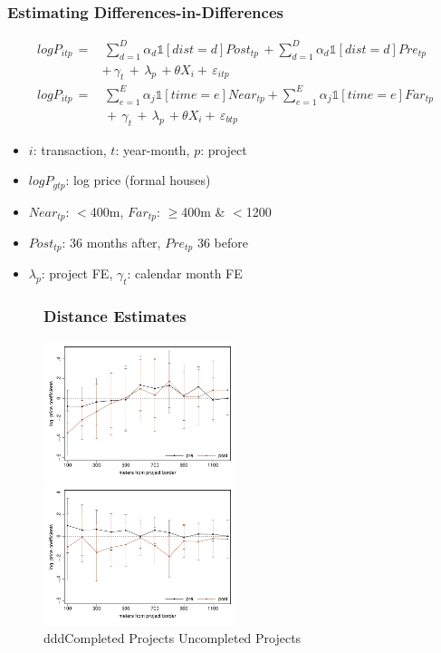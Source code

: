 \documentclass[aspectratio=149]{beamer}
\begin{document}
\begin{frame}
\frametitle{Estimating Differences-in-Differences}

\begin{align*}
log P_{itp} \, =& \, \sum_{d=1}^{D} \alpha_d \mathds{1}[dist=d] Post_{tp} \, + \sum_{d=1}^{D} \alpha_d \mathds{1}[dist=d] Pre_{tp} \\
& + \, \gamma_t \, + \, \lambda_p \, + \theta X_{i} + \, \varepsilon_{itp} \\
log P_{itp} \, =& \, \sum_{e=1}^{E} \alpha_j \mathds{1}[time=e] Near_{tp} + \sum_{e=1}^{E} \alpha_j \mathds{1}[time=e] Far_{tp} \\
& \, + \, \gamma_t \, + \, \lambda_p \, + \theta X_{i} + \, \varepsilon_{btp}
\end{align*}

\begin{itemize}
\item $i$: transaction, $t$: year-month, $p$: project
\item $log P_{gtp}$: log price (formal houses)
\item $Near_{tp}$: $<$400m, $Far_{tp}$: $\geq$400m \& $<$1200
\item $Post_{tp}$: 36 months after, $Pre_{tp}$ 36 before
\item $\lambda_p$: project FE, $\gamma_t$: calendar month FE
\end{itemize}


\end{frame}


\begin{frame}
\begin{figure}
\frametitle{Distance Estimates}
\includegraphics[width=0.5\textwidth,trim={.77cm 0cm .21cm 0cm}]{distplot.pdf}
\includegraphics[width=0.5\textwidth,trim={.77cm 0cm .21cm 0cm},clip]{distplot_placebo.pdf}\\
{\color{white}ddd}Completed Projects \hspace{2.4cm} Uncompleted Projects
\end{figure}

\end{frame}
\end{document}
